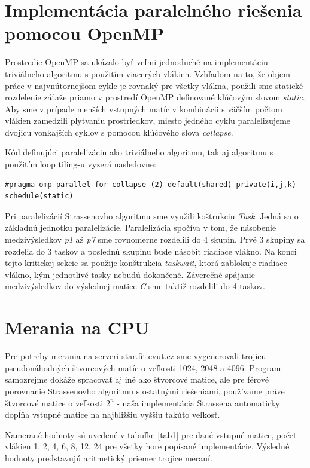 \documentclass[slovak]{article}
\begin{document}
\section{Implementácia paralelného riešenia pomocou OpenMP}

Prostredie OpenMP sa ukázalo byť veľmi jednoduché na implementáciu triviálneho algoritmu s použitím viacerých vlákien. Vzhľadom na to, že objem práce v najvnútornejšom cykle je rovnaký pre všetky vlákna, použili sme statické rozdelenie záťaže priamo v prostredí OpenMP definované kľúčovým slovom \emph{static}. Aby sme v prípade menších vstupných matíc v kombinácii s väčším počtom vlákien zamedzili plytvaniu prostriedkov, miesto jedného cyklu paralelizujeme dvojicu vonkajších cyklov s pomocou kľúčového slova \emph{collapse}.

Kód definujúci paralelizáciu ako triviálneho algoritmu, tak aj algoritmu s použitím loop tiling-u vyzerá nasledovne:

\begin{verbatim}
#pragma omp parallel for collapse (2) default(shared) private(i,j,k)
schedule(static)
\end{verbatim}

Pri paralelizácií Strassenovho algoritmu sme využili koštrukciu \emph{Task}. Jedná sa o základnú jednotku paralelizácie. Paralelizácia spočíva v tom, že násobenie medzivýsledkov \emph{p1} až \emph{p7} sme rovnomerne rozdelili do 4 skupin. Prvé 3 skupiny sa rozdelia do 3 taskov a poslednú skupinu bude násobiť riadiace vlákno. Na konci tejto kritickej sekcie sa použije konštrukcia \emph{taskwait}, ktorá zablokuje riadiace vlákno, kým jednotlivé tasky nebudú dokončené. Záverečné spájanie medzivýsledkov do výslednej matice \emph{C} sme taktiž rozdelili do 4 taskov.

\section{Merania na CPU}

Pre potreby merania na serveri star.fit.cvut.cz sme vygenerovali trojicu pseudonáhodných štvorcových matíc o veľkosti 1024, 2048 a 4096. Program samozrejme dokáže spracovať aj iné ako štvorcové matice, ale pre férové porovnanie Strassenovho algoritmu s ostatnými riešeniami, používame práve štvorcové matice o veľkosti  $2^n$ - naša implementácia Strassena automaticky dopĺňa vstupné matice na najbližšiu vyššiu takúto veľkosť.

Namerané hodnoty sú uvedené v tabuľke \ref{tab1} pre dané vstupné matice, počet vlákien 1, 2, 4, 6, 8, 12, 24 pre všetky hore popísané implementácie. Výsledné hodnoty predstavujú aritmetický priemer trojice meraní.
\end{document}

